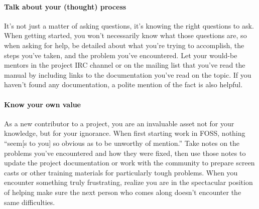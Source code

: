 \paragraph*{Talk about your (thought) process} It’s not just a matter of asking questions, it’s knowing the right questions to ask. When getting started, you won’t necessarily know what those questions are, so when asking for help, be detailed about what you’re trying to accomplish, the steps you’ve taken, and the problem you’ve encountered. Let your would-be mentors in the project IRC channel or on the mailing list that you’ve read the manual by including links to the documentation you’ve read on the topic. If you haven’t found any documentation, a polite mention of the fact is also helpful.

\paragraph*{Know your own value} As a new contributor to a project, you are an invaluable asset not for your knowledge, but for your ignorance. When first starting work in FOSS, nothing “seem[s to you] so obvious as to be unworthy of mention.” Take notes on the problems you’ve encountered and how they were fixed, then use those notes to update the project documentation or work with the community to prepare screen casts or other training materials for particularly tough problems. When you encounter something truly frustrating, realize you are in the spectacular position of helping make sure the next person who comes along doesn’t encounter the same difficulties.
